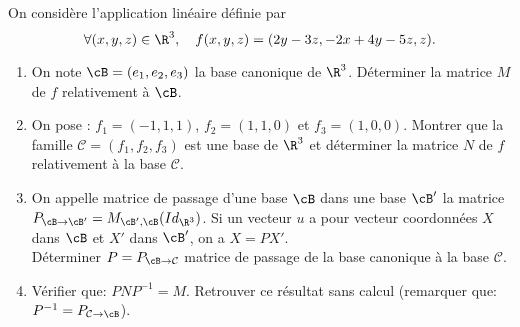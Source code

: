 \documentclass[a4paper, 11pt,reqno]{article}
\begin{document}
\begin{exercice}  \;
	On consid\`ere l'application lin\'eaire d\'efinie par
	$$\forall (x,y,z)\in\R^3,\quad f(x,y,z)=(2y-3z, -2x+4y-5z,z).$$
	\begin{enumerate}
		\item On note $\cB=(e_1,e_2,e_3)$ la base canonique de $\R^3$. D\'eterminer la matrice $M$ de $f$ relativement \`a $\cB$.
		\item On pose : $f_1=(-1,1,1)$, $f_2=(1,1,0)$ et $f_3=(1,0,0).$ Montrer que la famille $\mathcal{C}=(f_1,f_2,f_3)$ est une base de $\R^3$ et d\'eterminer la matrice $N$ de $f$ relativement \`a la base $\mathcal{C}$.
		\item On appelle matrice de passage d'une base $\cB$ dans une base $\cB'$ la matrice $P_{\cB\to\cB'} = M_{\cB',\cB}(Id_{\R^3})$. Si un vecteur $u$ a pour vecteur coordonn\'ees $X$ dans $\cB$ et $X'$ dans $\cB'$, on a $X=PX'$.\\
		      D\'eterminer $P=P_{\cB\to\mathcal{C}}$ matrice de passage de la base canonique \`a la base $\mathcal{C}$.\item V\'erifier que: $PNP^{-1}=M$. Retrouver ce r\'esultat sans calcul (remarquer que: $P^{-1}=P_{\mathcal{C} \to \cB}$).
	\end{enumerate}
\end{exercice}
\end{document}
